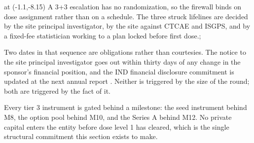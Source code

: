 \begin{appfloat}[!tb]
\begin{appfig}
  at (-1.1,-8.15) {A 3+3 escalation has no randomization, so the firewall binds
  on dose assignment rather than on a schedule. The three struck lifelines are
  decided by the site principal investigator, by the site against CTCAE and
  ISGPS, and by a fixed-fee statistician working to a plan locked before first
  dose.};
\end{appfig}
\vspace{-0.65cm}
\end{appfloat}

Two dates in that sequence are obligations rather than courtesies. The notice to
the site principal investigator goes out within thirty days of any change in the
sponsor's financial position, and the IND financial disclosure commitment is
updated at the next annual report \cite{ecfr2026part312}. Neither is triggered
by the size of the round; both are triggered by the fact of it.

Every tier 3 instrument is gated behind a milestone: the seed instrument behind
M8, the option pool behind M10, and the Series A behind M12. No private capital
enters the entity before dose level 1 has cleared, which is the single
structural commitment this section exists to make.

